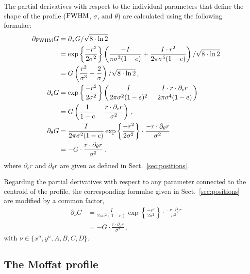 The partial derivatives with respect to the individual parameters that define the shape of the profile ($\text{FWHM}$, $\sigma$, and $\theta$) are calculated using the following formulae:
%
\begin{align}
 \partial_{\text{FWHM}} G &= \partial_\sigma G/\sqrt{8\cdot \ln 2} \nonumber\\
 &= \exp\left\{\frac{-r^2}{2\sigma^2}\right\} \left(\frac{-I}{\pi\sigma^3(1-e)} + \frac{I\cdot r^2}{2\pi\sigma^5(1-e)}\right)/\sqrt{8\cdot \ln 2} \nonumber \\
 &= G \left(\frac{r^2}{\sigma^3} - \frac{2}{\sigma}\right)/\sqrt{8\cdot \ln 2}\,,\\
 \partial_e G &= \exp\left\{\frac{-r^2}{2\sigma^2}\right\}\left(\frac{I}{2\pi\sigma^2(1-e)^2} - \frac{I\cdot r\cdot\partial_e r}{2\pi\sigma^4(1-e)}\right) \nonumber\\
 &= G \left( \frac{1}{1-e} - \frac{r\cdot\partial_e r}{\sigma^2} \right)\,,\\
 \partial_\theta G &= \frac{I}{2\pi\sigma^2(1-e)}\exp\left\{\frac{-r^2}{2\sigma^2}\right\}\cdot\frac{-r\cdot\partial_\theta r}{\sigma^2} \nonumber\\
 &= -G\cdot\frac{r\cdot\partial_\theta r}{\sigma^2}\,,
\end{align}
%
where $\partial_e r$ and $\partial_\theta r$ are given as defined in Sect.~\ref{sec:positions}.

Regarding the partial derivatives with respect to any parameter connected to the centroid of the profile, the  corresponding formulae given in Sect.~\ref{sec:positions} are modified by a common factor,
%
\begin{align}
 \partial_\nu G &= \frac{I}{2\pi\sigma^2(1-e)}\exp\left\{\frac{-r^2}{2\sigma^2}\right\}\cdot\frac{-r\cdot\partial_\nu r}{\sigma^2} \nonumber\\
 &= -G\cdot\frac{r\cdot\partial_\nu r}{\sigma^2}\,,
\end{align}
%
with $\nu \in \{x^n, y^n, A, B, C, D\}$.

\subsection{The Moffat profile}
\label{sec:moffat}

